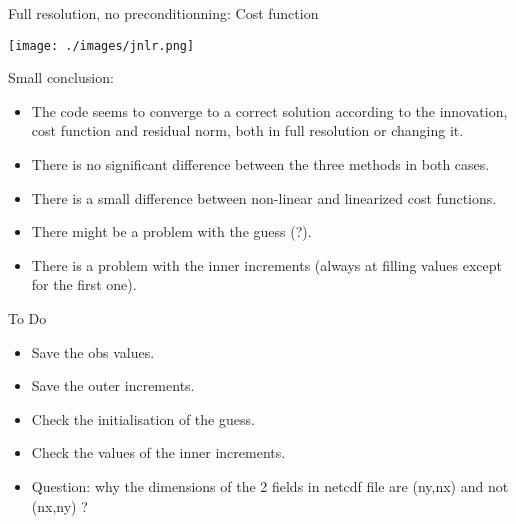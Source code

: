\documentclass[francais]{beamer}
\begin{document}
\begin{frame}{Full resolution, no preconditionning: Cost function}
\begin{center}
 \texttt{[image: ./images/jnlr.png]}
\end{center}
\end{frame}



\begin{frame}{Small conclusion:}
\begin{itemize}
 \item The code seems to converge to a correct solution according to the innovation, cost function and residual norm, both in full resolution or changing it.
 \item There is no significant difference between the three methods in both cases.
 \item There is a small difference between non-linear and linearized cost functions.
 \item There might be a problem with the guess (?).
 \item There is a problem with the inner increments (always at filling values except for the first one).
\end{itemize}
\end{frame}

\begin{frame}{To Do}
\begin{itemize}
 \item Save the obs values.
 \item Save the outer increments.
 \item Check the initialisation of the guess.
 \item Check the values of the inner increments.
 \item Question: why the dimensions of the 2 fields in netcdf file are (ny,nx) and not (nx,ny) ?
\end{itemize}
\end{frame}






\usebackgroundtemplate{}
\end{document}
